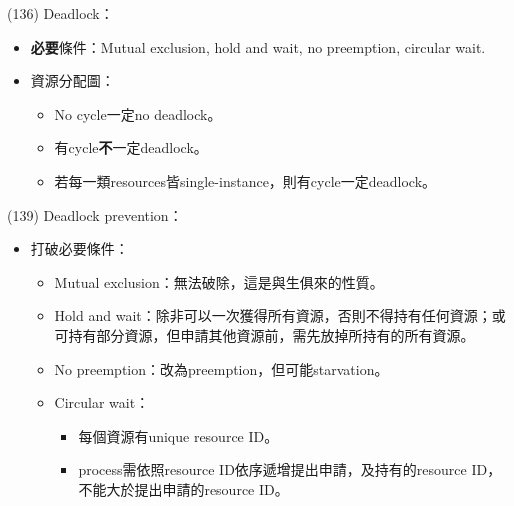 \begin{theorem}{(136)} Deadlock：\begin{itemize}
        \item \textbf{必要}條件：Mutual exclusion, hold and wait, no preemption, circular wait.
        \item 資源分配圖：\begin{itemize}
            \item No cycle一定no deadlock。
            \item 有cycle\textbf{不}一定deadlock。
            \item 若每一類resources皆single-instance，則有cycle一定deadlock。
        \end{itemize}
    \end{itemize}
\end{theorem}

\begin{theorem}{(139)} Deadlock prevention：\begin{itemize}
        \item 打破必要條件：\begin{itemize}
            \item Mutual exclusion：無法破除，這是與生俱來的性質。
            \item Hold and wait：除非可以一次獲得所有資源，否則不得持有任何資源；或可持有部分資源，但申請其他資源前，需先放掉所持有的所有資源。
            \item No preemption：改為preemption，但可能starvation。
            \item Circular wait：\begin{itemize}
                \item 每個資源有unique resource ID。
                \item process需依照resource ID依序遞增提出申請，及持有的resource ID，不能大於提出申請的resource ID。
            \end{itemize}
        \end{itemize}
    \end{itemize}
\end{theorem}

